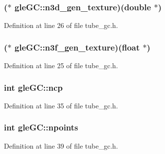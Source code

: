 \hypertarget{structgle_g_c_a575a4e166c64f64c4bf599c9ead24619}{
\subsubsection[{n3d\-\_\-gen\-\_\-texture}]{($\ast$ gle\-G\-C\-::n3d\-\_\-gen\-\_\-texture)(double $\ast$)}}\label{structgle_g_c_a575a4e166c64f64c4bf599c9ead24619}


Definition at line 26 of file tube\-\_\-gc.\-h.

\hypertarget{structgle_g_c_afdf84824006ad343a2bd492f880e0119}{
\subsubsection[{n3f\-\_\-gen\-\_\-texture}]{($\ast$ gle\-G\-C\-::n3f\-\_\-gen\-\_\-texture)(float $\ast$)}}\label{structgle_g_c_afdf84824006ad343a2bd492f880e0119}


Definition at line 25 of file tube\-\_\-gc.\-h.

\hypertarget{structgle_g_c_ae229caf1e12e35810fb0f4e1f4dfe277}{
\subsubsection[{ncp}]{\setlength{\rightskip}{0pt plus 5cm}int gle\-G\-C\-::ncp}}\label{structgle_g_c_ae229caf1e12e35810fb0f4e1f4dfe277}


Definition at line 35 of file tube\-\_\-gc.\-h.

\hypertarget{structgle_g_c_a892b2a8340dc3a90b65de9738f78a0e0}{
\subsubsection[{npoints}]{\setlength{\rightskip}{0pt plus 5cm}int gle\-G\-C\-::npoints}}\label{structgle_g_c_a892b2a8340dc3a90b65de9738f78a0e0}


Definition at line 39 of file tube\-\_\-gc.\-h.


